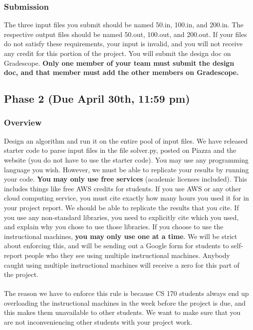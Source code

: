 \documentclass{article}
\begin{document}
\subsubsection*{Submission}
The three input files you submit should be named 50.in, 100.in, and 200.in. The respective output files should be named 50.out, 100.out, and 200.out. If your files do not satisfy these requirements, your input is invalid, and you will not receive any credit for this portion of the project. You will submit the design doc on Gradescope. \textbf{Only one member of your team must submit the design doc, and that member must add the other members on Gradescope.}

\subsection*{Phase 2 (Due April 30th, 11:59 pm)}

\subsubsection*{Overview}

Design an algorithm and run it on the entire pool of input files. We have released starter code to parse input files in the file solver.py, posted on Piazza and the website (you do not have to use the starter code). You may use any programming language you wish. However, we must be able to replicate your results by running your code. \textbf{You may only use free services} (academic licenses included). This includes things like free AWS credits for students. If you use AWS or any other cloud computing service, you must cite exactly how many hours you used it for in your project report. We should be able to replicate the results that you cite. If you use any non-standard libraries, you need to explicitly cite which you used, and explain why you chose to use those libraries. If you choose to use the instructional machines, \textbf{you may only use one at a time}. We will be strict about enforcing this, and will be sending out a Google form for students to self-report people who they see using multiple instructional machines. Anybody caught using multiple instructional machines will receive a zero for this part of the project.
\\ \\
The reason we have to enforce this rule is because CS 170 students always end up overloading the instructional machines in the week before the project is due, and this makes them unavailable to other students. We want to make sure that you are not inconveniencing other students with your project work.
\end{document}
